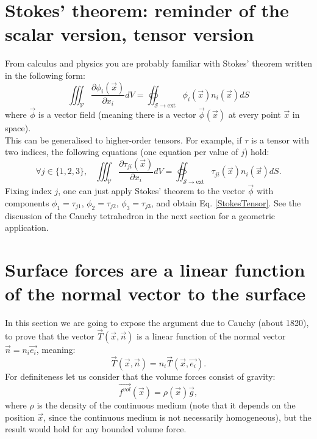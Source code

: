 \documentclass[DIV=12]{article}
\newcommand{\vol}{\mathcal{V}}
\newcommand{\sExt}{{{\mathcal{S}}\rightarrow{\mathrm{ext}}}}
\newcommand{\intVol}{\iiint}
\newcommand{\intSurf}{\oiint}
\newcommand{\fVol}{\overrightarrow{f^{vol}}}
\begin{document}
\section{Stokes' theorem: reminder of the scalar version, tensor version}

 From calculus and physics you are probably familiar 
 with Stokes' theorem written in the following form:
\begin{equation}
\intVol_\vol  \frac{\partial \phi_i(\vec{x}) }{\partial x_i} dV = \intSurf_\sExt  \phi_i (\vec{x}) n_i (\vec{x}) dS
\label{stokesVec}
\end{equation}
 where $\vec{\phi}$ is a vector field (meaning there is a vector $\vec{\phi}(\vec{x})$
 at every point $\vec{x}$ in space).\\

This can be generalised to higher-order tensors. For example, if $\tau$ 
 is a tensor with two indices, the following equations  (one equation per value of $j$) hold:
\begin{equation}
  \forall j \in \{1,2,3\},\;\;\;\intVol_\vol  \frac{\partial \tau_{ji}(\vec{x})}{\partial x_i} dV = \intSurf_\sExt  \tau_{ji} (\vec{x})n_i (\vec{x})dS.
 \label{StokesTensor}
\end{equation}
 Fixing index $j$, one can just apply Stokes' theorem to the 
 vector $\vec{\phi}$ with components $\phi_1 = \tau_{j1}$, $\phi_2 = \tau_{j2}$,
$\phi_3 = \tau_{j3}$, and obtain Eq. \ref{StokesTensor}. See the 
 discussion of the Cauchy tetrahedron in the next section 
  for a geometric application. 



\section{Surface forces are a linear function of the normal vector to the surface}

In this section we are going to expose the argument due to Cauchy (about 1820),
 to prove that the vector $\vec{T}( \vec{x},\vec{n} )$
 is a linear function of the normal vector $\vec{n} = n_i\vec{e_i}$, meaning:
 \begin{equation}
\vec{T}( \vec{x},\vec{n} ) = n_i \vec{T}( \vec{x}, \vec{e_i} ).
 \label{linearityEq} 
 \end{equation}
 For definiteness let us consider that the volume forces 
 consist of gravity:
\begin{equation}
\fVol (\vec{x})= \rho(\vec{x}) \vec{g},
\label{fVolDef}
\end{equation}
 where $\rho$ is the density of the continuous medium (note that it depends on the position $\vec{x}$, since the continuous 
 medium is not necessarily homogeneous), but the result 
 would hold for any bounded volume force.\\ 
\end{document}
